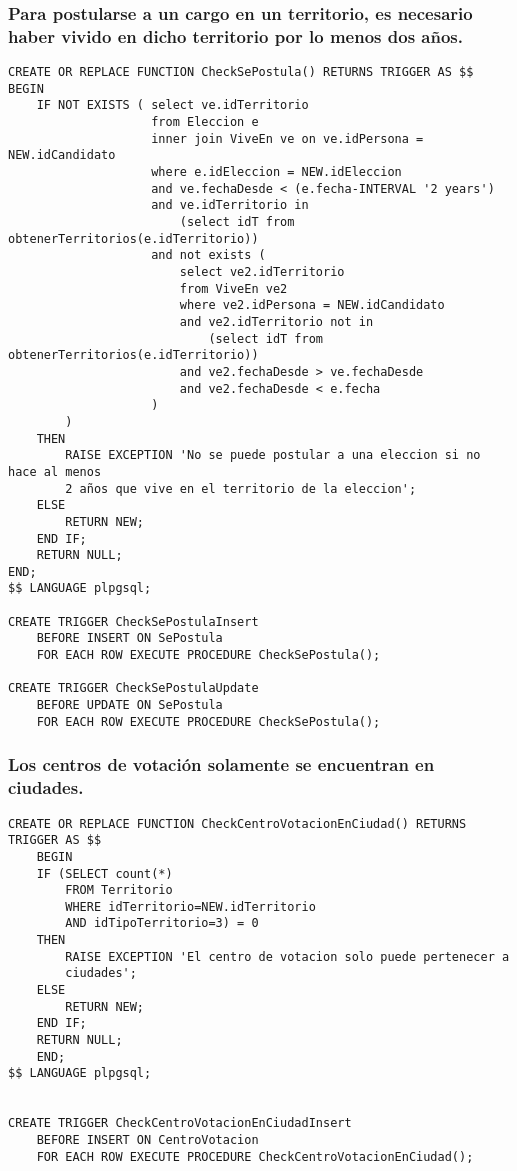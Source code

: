 \subsubsection{Para postularse a un cargo en un territorio, es necesario haber vivido en dicho territorio por lo menos dos años.}
\begin{verbatim}
CREATE OR REPLACE FUNCTION CheckSePostula() RETURNS TRIGGER AS $$
BEGIN
    IF NOT EXISTS ( select ve.idTerritorio 
                    from Eleccion e
                    inner join ViveEn ve on ve.idPersona = NEW.idCandidato
                    where e.idEleccion = NEW.idEleccion
                    and ve.fechaDesde < (e.fecha-INTERVAL '2 years')
                    and ve.idTerritorio in 
                        (select idT from obtenerTerritorios(e.idTerritorio))
                    and not exists (
                        select ve2.idTerritorio
                        from ViveEn ve2 
                        where ve2.idPersona = NEW.idCandidato
                        and ve2.idTerritorio not in 
                            (select idT from obtenerTerritorios(e.idTerritorio))
                        and ve2.fechaDesde > ve.fechaDesde
                        and ve2.fechaDesde < e.fecha
                    )
        )
    THEN
        RAISE EXCEPTION 'No se puede postular a una eleccion si no hace al menos 
        2 años que vive en el territorio de la eleccion';
    ELSE
        RETURN NEW;
    END IF;
    RETURN NULL;
END;
$$ LANGUAGE plpgsql;

CREATE TRIGGER CheckSePostulaInsert
    BEFORE INSERT ON SePostula
    FOR EACH ROW EXECUTE PROCEDURE CheckSePostula();
    
CREATE TRIGGER CheckSePostulaUpdate
    BEFORE UPDATE ON SePostula
    FOR EACH ROW EXECUTE PROCEDURE CheckSePostula();
\end{verbatim}

\subsubsection{Los centros de votación solamente se encuentran en ciudades.}
\begin{verbatim}
CREATE OR REPLACE FUNCTION CheckCentroVotacionEnCiudad() RETURNS TRIGGER AS $$
    BEGIN
    IF (SELECT count(*) 
        FROM Territorio 
        WHERE idTerritorio=NEW.idTerritorio 
        AND idTipoTerritorio=3) = 0 
    THEN
        RAISE EXCEPTION 'El centro de votacion solo puede pertenecer a 
        ciudades';              
    ELSE
        RETURN NEW;
    END IF;
    RETURN NULL;
    END;
$$ LANGUAGE plpgsql;


CREATE TRIGGER CheckCentroVotacionEnCiudadInsert
    BEFORE INSERT ON CentroVotacion
    FOR EACH ROW EXECUTE PROCEDURE CheckCentroVotacionEnCiudad();

\end{verbatim}

